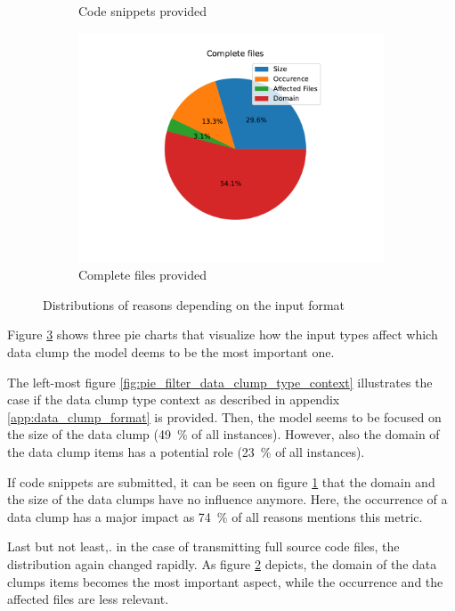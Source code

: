 \begin{figure}
\begin{subfigure}[b]{0.4\textwidth}
     \caption{Code snippets provided}
    \label{fig:pie_filter_code_snippets}
    \end{subfigure}
    \hspace{4cm}
           \begin{subfigure}[b]{0.4\textwidth}
    \includegraphics[width=1\columnwidth]{figures/chapter5/filter_reason_Complete_files.pdf}
     \caption{Complete files  provided}
    \label{fig:pie_filter_full_code}
    \end{subfigure}
    \caption{Distributions of reasons depending on the input format}
    \label{fig:reason_distr}
\end{figure}

Figure \ref{fig:reason_distr} shows three pie charts that visualize how the input types affect which data clump the model deems to be the most important one. 

The left-most figure \ref{fig:pie_filter_data_clump_type_context} illustrates the case if the data clump type context as described in appendix \ref{app:data_clump_format} is provided. Then, the model seems to be focused on the size of the data clump (49~\% of all instances). However, also the domain of the data clump items has a potential role (23~\% of all instances).

If code snippets are submitted, it can be seen on figure \ref{fig:pie_filter_code_snippets} that the domain and  the size of the data clumps have no influence anymore. Here, the occurrence of a data clump has a major impact as 74~\% of all reasons mentions this metric. 

Last but not least,. in the case of transmitting full source code files, the distribution again changed rapidly. As figure \ref{fig:pie_filter_full_code} depicts, the domain of the data clumps items becomes the most important aspect, while the occurrence and the affected files are less relevant.

